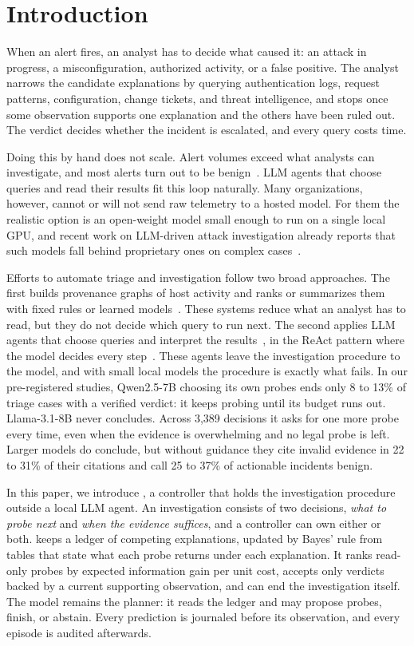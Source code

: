 \section{Introduction}
\label{sec:intro}

When an alert fires, an analyst has to decide what caused it: an attack in progress, a misconfiguration, authorized activity, or a false positive. The analyst narrows the candidate explanations by querying authentication logs, request patterns, configuration, change tickets, and threat intelligence, and stops once some observation supports one explanation and the others have been ruled out. The verdict decides whether the incident is escalated, and every query costs time.

Doing this by hand does not scale. Alert volumes exceed what analysts can investigate, and most alerts turn out to be benign~\citep{nodoze}. LLM agents that choose queries and read their results fit this loop naturally. Many organizations, however, cannot or will not send raw telemetry to a hosted model. For them the realistic option is an open-weight model small enough to run on a single local GPU, and recent work on LLM-driven attack investigation already reports that such models fall behind proprietary ones on complex cases~\citep{clouseau}.

Efforts to automate triage and investigation follow two broad approaches. The first builds provenance graphs of host activity and ranks or summarizes them with fixed rules or learned models~\citep{nodoze,kairos}. These systems reduce what an analyst has to read, but they do not decide which query to run next. The second applies LLM agents that choose queries and interpret the results~\citep{excytin,clouseau}, in the ReAct pattern where the model decides every step~\citep{react}. These agents leave the investigation procedure to the model, and with small local models the procedure is exactly what fails. In our pre-registered studies, Qwen2.5-7B choosing its own probes ends only 8 to 13\% of triage cases with a verified verdict: it keeps probing until its budget runs out. Llama-3.1-8B never concludes. Across 3{,}389 decisions it asks for one more probe every time, even when the evidence is overwhelming and no legal probe is left. Larger models do conclude, but without guidance they cite invalid evidence in 22 to 31\% of their citations and call 25 to 37\% of actionable incidents benign.

In this paper, we introduce \hesp{}, a controller that holds the investigation procedure outside a local LLM agent. An investigation consists of two decisions, \emph{what to probe next} and \emph{when the evidence suffices}, and a controller can own either or both. \hesp{} keeps a ledger of competing explanations, updated by Bayes' rule from tables that state what each probe returns under each explanation. It ranks read-only probes by expected information gain per unit cost, accepts only verdicts backed by a current supporting observation, and can end the investigation itself. The model remains the planner: it reads the ledger and may propose probes, finish, or abstain. Every prediction is journaled before its observation, and every episode is audited afterwards.

